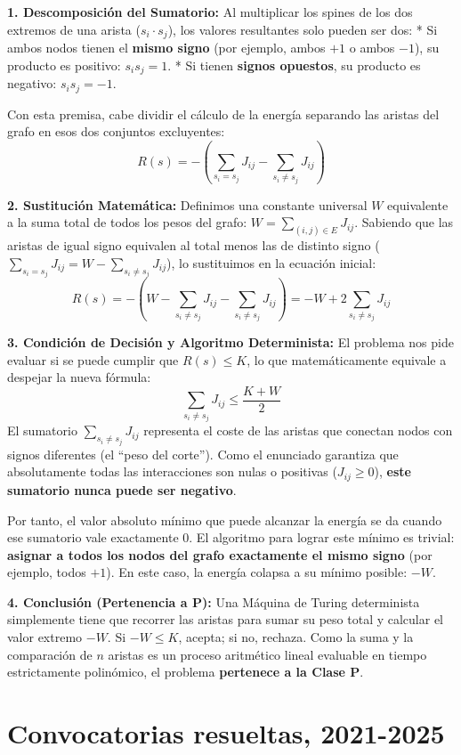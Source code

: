 \documentclass[12pt]{book} %
\begin{document}
\textbf{1. Descomposición del Sumatorio:} Al multiplicar los spines de
los dos extremos de una arista (\(s_i \cdot s_j\)), los valores
resultantes solo pueden ser dos: * Si ambos nodos tienen el
\textbf{mismo signo} (por ejemplo, ambos \(+1\) o ambos \(-1\)), su
producto es positivo: \(s_i s_j = 1\). * Si tienen \textbf{signos
opuestos}, su producto es negativo: \(s_i s_j = -1\).

Con esta premisa, cabe dividir el cálculo de la energía separando las
aristas del grafo en esos dos conjuntos excluyentes:
\[R(s) = -\left( \sum_{s_i = s_j} J_{ij} - \sum_{s_i \neq s_j} J_{ij} \right)\]

\textbf{2. Sustitución Matemática:} Definimos una constante universal
\(W\) equivalente a la suma total de todos los pesos del grafo:
\(W = \sum_{(i,j)\in E} J_{ij}\). Sabiendo que las aristas de igual
signo equivalen al total menos las de distinto signo
(\(\sum_{s_i = s_j} J_{ij} = W - \sum_{s_i \neq s_j} J_{ij}\)), lo
sustituimos en la ecuación inicial:
\[R(s) = -\left( W - \sum_{s_i \neq s_j} J_{ij} - \sum_{s_i \neq s_j} J_{ij} \right) = -W + 2 \sum_{s_i \neq s_j} J_{ij}\]

\textbf{3. Condición de Decisión y Algoritmo Determinista:} El problema
nos pide evaluar si se puede cumplir que \(R(s) \le K\), lo que
matemáticamente equivale a despejar la nueva fórmula:
\[ \sum_{s_i \neq s_j} J_{ij} \le \frac{K + W}{2} \] El sumatorio
\(\sum_{s_i \neq s_j} J_{ij}\) representa el coste de las aristas que
conectan nodos con signos diferentes (el ``peso del corte''). Como el
enunciado garantiza que absolutamente todas las interacciones son nulas
o positivas (\(J_{ij} \ge 0\)), \textbf{este sumatorio nunca puede ser
negativo}.

Por tanto, el valor absoluto mínimo que puede alcanzar la energía se da
cuando ese sumatorio vale exactamente \(0\). El algoritmo para lograr
este mínimo es trivial: \textbf{asignar a todos los nodos del grafo
exactamente el mismo signo} (por ejemplo, todos \(+1\)). En este caso,
la energía colapsa a su mínimo posible: \textbf{\(-W\)}.

\textbf{4. Conclusión (Pertenencia a P):} Una Máquina de Turing
determinista simplemente tiene que recorrer las aristas para sumar su
peso total y calcular el valor extremo \(-W\). Si \(-W \le K\), acepta;
si no, rechaza. Como la suma y la comparación de \(n\) aristas es un
proceso aritmético lineal evaluable en tiempo estrictamente polinómico,
el problema \textbf{pertenece a la Clase P}.

\hypertarget{convocatorias-resueltas-2021-2025}{%
\chapter{Convocatorias resueltas,
2021-2025}\label{convocatorias-resueltas-2021-2025}}
\end{document}
